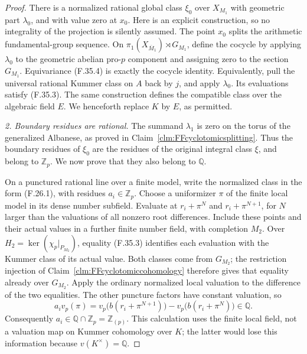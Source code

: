 \documentclass[11pt]{article}
\begin{document}
\begin{proof}
There is a normalized rational global class
\(\xi_0\) over \(X_{M_1}\) with geometric part
\(\lambda_0\), and with value zero at \(x_0\).
Here is an explicit construction, so no integrality
of the projection is silently assumed. The point
\(x_0\) splits the arithmetic fundamental-group
sequence. On
\(\pi_1(X_{\overline M_1})\rtimes G_{M_1}\),
define the cocycle by applying \(\lambda_0\)
to the geometric abelian pro-\(p\) component
and assigning zero to the section \(G_{M_1}\).
Equivariance (F.35.4) is exactly the cocycle
identity. Equivalently, pull the universal rational
Kummer class on \(A\) back by \(j\), and apply
\(\lambda_0\). Its evaluations satisfy (F.35.3).
The same construction defines the compatible
class over the algebraic field \(E\).
We henceforth replace \(K\) by \(E\), as permitted.

\emph{2. Boundary residues are rational.}
The summand \(\lambda_1\) is zero on the torus
of the generalized Albanese, as proved in
Claim~\ref{clm:FFcyclotomicsplitting}. Thus the
boundary residues of \(\xi_0\) are the residues
of the original integral class \(\xi\), and
belong to \(\mathbb Z_p\). We now prove that
they also belong to \(\mathbb Q\).

On a punctured rational line over a finite model,
write the normalized class in the form (F.26.1),
with residues \(a_i\in\mathbb Z_p\). Choose
a uniformizer \(\pi\) of the finite local model
in its dense number subfield. Evaluate at
\(r_i+\pi^N\) and \(r_i+\pi^{N+1}\), for \(N\)
larger than the valuations of all nonzero root
differences. Include these points and their
actual values in a further finite number field,
with completion \(M_2\). Over
\(H_2=\ker(\chi_p|_{P_{M_2}})\), equality
(F.35.3) identifies each evaluation with the
Kummer class of its actual value. Both classes
come from \(G_{M_2}\); the restriction injection
of Claim~\ref{clm:FFcyclotomiccohomology} therefore
gives that equality already over \(G_{M_2}\).
Apply the ordinary normalized local valuation
to the difference of the two equalities. The
other puncture factors have constant valuation,
so
\[
        a_i v_p(\pi)
           =v_p\bigl(b(r_i+\pi^{N+1})\bigr)
                -v_p\bigl(b(r_i+\pi^N)\bigr)
                    \in\mathbb Q.
                                                        \tag{F.35.5}
\]
Consequently \(a_i\in\mathbb Q\cap\mathbb Z_p
=\mathbb Z_{(p)}\).
This calculation uses the finite local field,
not a valuation map on Kummer cohomology over
\(K\); the latter would lose this information
because \(v(K^\times)=\mathbb Q\).


\end{proof}
\end{document}
